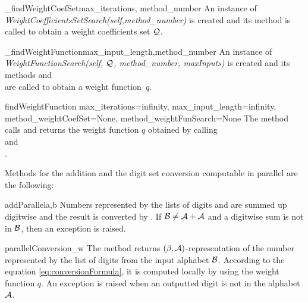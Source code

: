 \begin{method}{\_findWeightCoefSet}{max\_iterations, method\_number}
An instance of \emph{WeightCoefficientsSetSearch(self,method\_number)} is created and  its method  is called to obtain a weight coefficients set $\mathcal{Q}$.
\end{method}

\begin{method}{\_findWeightFunction}{max\_input\_length,method\_number}
An instance of \emph{WeightFunctionSearch(self, $\mathcal{Q}$, method\_number, maxInputs)} is created and its methods  and \\  are called to obtain a weight function~$q$.
\end{method}


\begin{method}{findWeightFunction}{ max\_iterations=infinity, max\_input\_length=infinity, \\ method\_weightCoefSet=None, method\_weightFunSearch=None}
The method calls  and returns the weight function $q$ obtained by calling \\  and \\ .
\end{method}

%


Methods for the addition and the digit set conversion computable in parallel are the following:

\begin{method}{addParallel}{a,b}
Numbers represented by the lists of digits  and  are summed up digitwise and the result is converted by . If $\mathcal{B}\neq\mathcal{A}+\mathcal{A}$ and a digitwise sum is not in $\mathcal{B}$, then an exception is raised.
\end{method}


\begin{method}{parallelConversion}{\_w}
The method returns $(\beta,\mathcal{A})$-representation of the number represented by the list  of digits from the input alphabet $\mathcal{B}$. According to the equation \eqref{eq:conversionFormula}, it is computed locally by using the weight function $q$. An exception is raised when an outputted digit is not in the alphabet $\mathcal{A}$.
\end{method}


